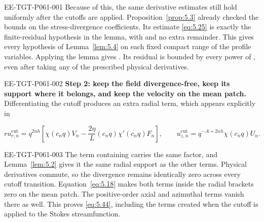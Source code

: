 %
\begin{EESegment}{EE-TGT-P061-001}
Because of this, the same derivative estimates still hold uniformly after the cutoffs are applied. Proposition~\ref{prop:5.3} already checked the bounds on the stress-divergence coefficients. Its estimate \eqref{eq:5.25} is exactly the finite-residual hypothesis in the lemma, with  and no extra remainder. This gives every hypothesis of Lemma~\ref{lem:5.4} on each fixed compact range of the profile variables. Applying the lemma gives . Its residual  is bounded by every power of , even after taking any of the prescribed physical derivatives.
\end{EESegment}

\begin{EESegment}{EE-TGT-P061-002}
\textbf{Step 2: keep the field divergence-free, keep its support where it belongs, and keep the velocity on the mean patch.} Differentiating the cutoff produces an extra radial term, which appears explicitly in
\end{EESegment}
\begin{equation}
 r u^{\mathrm{cut}}_{r,n}
 =q^{2nh}\left[\chi(c_nq)V_n-\frac{2\eta}{L}(c_nq)\chi'(c_nq)F_n\right],
 \qquad
 u^{\mathrm{cut}}_{z,n}=q^{-A+2nh}\chi(c_nq)U_n.
 \tag{5.45}\label{eq:5.45}
\end{equation}
\begin{EESegment}{EE-TGT-P061-003}
The term containing  carries the same  factor, and Lemma~\ref{lem:5.2} gives it the same radial support as the other terms. Physical derivatives commute, so the divergence remains identically zero across every cutoff transition. Equation~\eqref{eq:5.18} makes both terms inside the radial brackets zero on the mean patch. The positive-order axial and azimuthal terms vanish there as well. This proves \eqref{eq:5.44}, including the terms created when the cutoff is applied to the Stokes streamfunction.
\end{EESegment}

